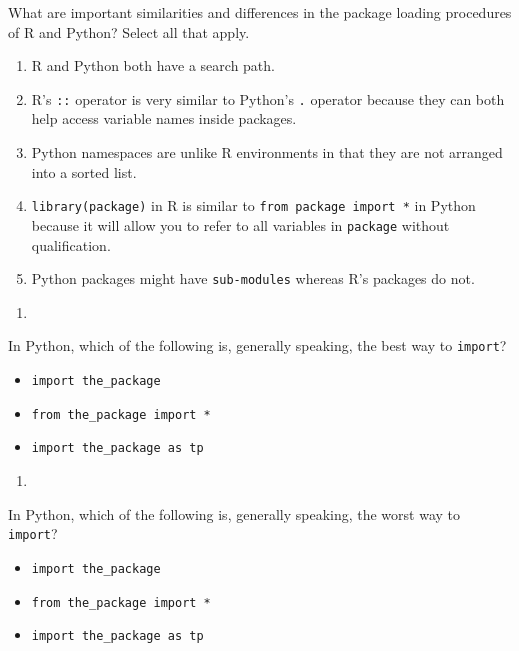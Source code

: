 \documentclass[12pt,krantz2]{krantz}
\providecommand{\tightlist}{%
  \setlength{\itemsep}{0pt}\setlength{\parskip}{0pt}}
\begin{document}
What are important similarities and differences in the package loading procedures of R and Python? Select all that apply.

\begin{enumerate}
\def\labelenumi{\alph{enumi})}
\tightlist
\item
  R and Python both have a search path.
\item
  R's \texttt{::} operator is very similar to Python's \texttt{.} operator because they can both help access variable names inside packages.
\item
  Python namespaces are unlike R environments in that they are not arranged into a sorted list.
\item
  \texttt{library(package)} in R is similar to \texttt{from\ package\ import\ *} in Python because it will allow you to refer to all variables in \texttt{package} without qualification.
\item
  Python packages might have \texttt{sub-modules} whereas R's packages do not.
\end{enumerate}

\begin{enumerate}
\def\labelenumi{\arabic{enumi}.}
\setcounter{enumi}{2}
\item
\end{enumerate}

In Python, which of the following is, generally speaking, the best way to \texttt{import}?

\begin{itemize}
\tightlist
\item
  \texttt{import\ the\_package}
\item
  \texttt{from\ the\_package\ import\ *}
\item
  \texttt{import\ the\_package\ as\ tp}
\end{itemize}

\begin{enumerate}
\def\labelenumi{\arabic{enumi}.}
\setcounter{enumi}{3}
\item
\end{enumerate}

In Python, which of the following is, generally speaking, the worst way to \texttt{import}?

\begin{itemize}
\tightlist
\item
  \texttt{import\ the\_package}
\item
  \texttt{from\ the\_package\ import\ *}
\item
  \texttt{import\ the\_package\ as\ tp}
\end{itemize}
\end{document}
